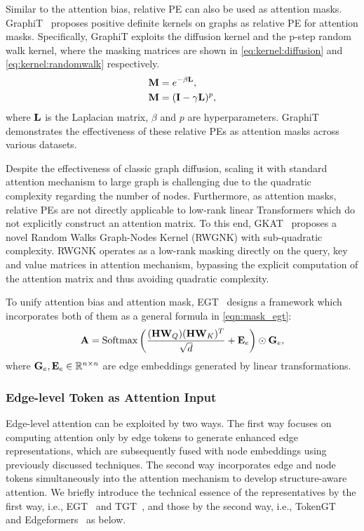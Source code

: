 Similar to the attention bias, relative PE can also be used as attention masks.
GraphiT~\cite{mialon2021graphit} proposes positive definite kernels on graphs as relative PE for attention masks. Specifically, GraphiT exploits the diffusion kernel and the p-step random walk kernel, where the masking matrices are shown in \cref{eq:kernel:diffusion} and \cref{eq:kernel:randomwalk} respectively.
\begin{align}
    \mathbf{M} &= e^{- \beta \mathbf{L}}\label{eq:kernel:diffusion}, \\
    \label{eq:kernel:randomwalk}
    \mathbf{M} &= (\mathbf{I}  - \gamma \mathbf{L})^{p}, 
\end{align}
where $\mathbf{L}$ is the Laplacian matrix, $\beta$ and $p$ are hyperparameters. 
GraphiT demonstrates the effectiveness of these relative PEs as attention masks across various datasets.

Despite the effectiveness of classic graph diffusion, scaling it with standard attention mechanism to large graph is challenging due to the quadratic complexity regarding the number of nodes. Furthermore, as attention masks, relative PEs are not directly applicable to low-rank linear Transformers which do not explicitly construct an attention matrix. To this end, GKAT~\cite{choromanski2022block} proposes a novel Random Walks Graph-Nodes Kernel (RWGNK) with sub-quadratic complexity. RWGNK operates as  a low-rank masking directly on the query, key and value matrices in attention mechanism, 
bypassing the explicit computation of the attention matrix and thus avoiding quadratic complexity. 

To unify attention bias and attention mask, EGT~\cite{hussain2022global} designs a framework which incorporates both of them as a general formula in \cref{eqn:mask_egt}:
\begin{align}
\label{eqn:mask_egt}
    \mathbf{A}=\text{Softmax}\left(\frac{(\mathbf{H}\mathbf{W}_{Q})(\mathbf{H}\mathbf{W}_{K})^T}{\sqrt{d}} + \mathbf{E}_{e}\right) \odot \mathbf{G}_{e},
\end{align}
where $\mathbf{G}_{e}, \mathbf{E}_{e} \in \mathbb{R}^{n\times n}$ are edge embeddings generated by linear transformations.

\subsubsection{Edge-level Token as Attention Input}
Edge-level attention can be exploited by two ways. The first way focuses on computing attention only by edge tokens to generate enhanced edge representations, which are subsequently fused with node embeddings using previously discussed techniques.
The second way incorporates edge and node tokens simultaneously into the attention mechanism to develop structure-aware attention. 
We briefly introduce the technical essence of the representatives by the first way, i.e., EGT~\cite{hussain2022global} and TGT~\cite{hussain2024triplet}, and those by the second way, i.e., TokenGT~\cite{TokenGT} and Edgeformers~\cite{jin2023edgeformers} as below.

